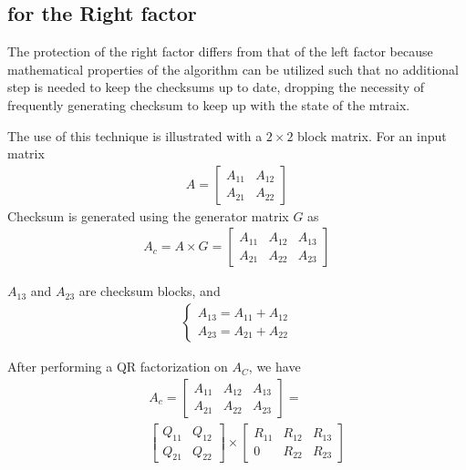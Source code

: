 \subsection{\abft for the Right factor}
The protection of the right factor differs from that of the left
factor because mathematical properties of the algorithm can be utilized 
such that no additional step is needed to keep the checksums up to
date, dropping the necessity of frequently generating checksum to keep
up with the state of the mtraix. 


The use of this technique is illustrated with a $2\times 2$ block
matrix. For an input matrix
\begin{eqnarray*}
A=\begin{bmatrix}
A_{11} & A_{12}\\ 
A_{21} & A_{22}
\end{bmatrix}
\end{eqnarray*}
Checksum is generated using the generator matrix $G$ as 
\begin{eqnarray*}
A_{c}=A\times G=\begin{bmatrix}
A_{11} & A_{12} & A_{13}\\ 
A_{21} & A_{22} & A_{23}
\end{bmatrix}
\end{eqnarray*}

$A_{13}$ and $A_{23}$ are checksum blocks, and
\begin{eqnarray}
\label{eqn:checksum-qr}
\left\{\begin{matrix}
A_{13}=A_{11}+A_{12}\\ 
A_{23}=A_{21}+A_{22}
\end{matrix}\right.
\end{eqnarray}

After performing a QR factorization on $A_{C}$, we have
\begin{eqnarray}
\label{eqn:qrqr}
&&A_{c}=\begin{bmatrix}
A_{11} & A_{12} & A_{13}\\ 
A_{21} & A_{22} & A_{23}
\end{bmatrix}=\nonumber \\
&&\begin{bmatrix}
Q_{11} & Q_{12}\\ 
Q_{21} & Q_{22}
\end{bmatrix}\times
\begin{bmatrix}
R_{11} & R_{12} & R_{13}\\ 
0 &  R_{22} & R_{23}
\end{bmatrix}
\end{eqnarray}

